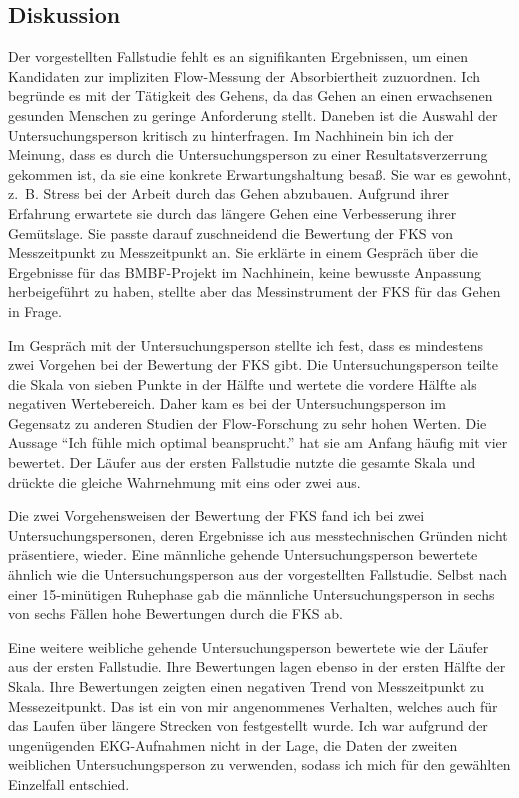 \subsection{Diskussion}
\label{sub:diskussion_2}
Der vorgestellten Fallstudie fehlt es an signifikanten Ergebnissen, um einen Kandidaten zur impliziten Flow-Messung der Absorbiertheit zuzuordnen. Ich begründe es mit der Tätigkeit des Gehens, da das Gehen an einen erwachsenen gesunden Menschen zu geringe Anforderung stellt. Daneben ist die Auswahl der Untersuchungsperson kritisch zu hinterfragen. Im Nachhinein bin ich der Meinung, dass es durch die Untersuchungsperson zu einer Resultatsverzerrung gekommen ist, da sie eine konkrete Erwartungshaltung besaß. Sie war es gewohnt, z.~B. Stress bei der Arbeit durch das Gehen abzubauen. Aufgrund ihrer Erfahrung erwartete sie durch das längere Gehen eine Verbesserung ihrer Gemütslage. Sie passte darauf zuschneidend die Bewertung der \ac{FKS} von Messzeitpunkt zu Messzeitpunkt an. Sie erklärte in einem Gespräch über die Ergebnisse für das \acs{BMBF}-Projekt im Nachhinein, keine bewusste Anpassung herbeigeführt zu haben, stellte aber das Messinstrument der \ac{FKS} für das Gehen in Frage.

Im Gespräch mit der Untersuchungsperson stellte ich fest, dass es mindestens zwei Vorgehen bei der Bewertung der \ac{FKS} gibt. Die Untersuchungsperson teilte die Skala von sieben Punkte in der Hälfte und wertete die vordere Hälfte als negativen Wertebereich. Daher kam es bei der Untersuchungsperson im Gegensatz zu anderen Studien der Flow-Forschung zu sehr hohen Werten. Die Aussage "`Ich fühle mich optimal beansprucht."' hat sie am Anfang häufig mit vier bewertet. Der Läufer aus der ersten Fallstudie nutzte die gesamte Skala und drückte die gleiche Wahrnehmung mit eins oder zwei aus. 

Die zwei Vorgehensweisen der Bewertung der \ac{FKS} fand ich bei zwei Untersuchungspersonen, deren Ergebnisse ich aus messtechnischen Gründen nicht präsentiere, wieder. Eine männliche gehende Untersuchungsperson bewertete ähnlich wie die Untersuchungsperson aus der vorgestellten Fallstudie. Selbst nach einer 15-minütigen Ruhephase gab die männliche Untersuchungsperson in sechs von sechs Fällen hohe Bewertungen durch die \ac{FKS} ab.

Eine weitere weibliche gehende Untersuchungsperson bewertete wie der Läufer aus der ersten Fallstudie. Ihre Bewertungen lagen ebenso in der ersten Hälfte der Skala. Ihre Bewertungen zeigten einen negativen Trend von Messzeitpunkt zu Messezeitpunkt. Das ist ein von mir angenommenes Verhalten, welches auch für das Laufen über längere Strecken von \citet{Schuler2009} festgestellt wurde. Ich war aufgrund der ungenügenden \ac{EKG}-Aufnahmen nicht in der Lage, die Daten der zweiten weiblichen Untersuchungsperson zu verwenden, sodass ich mich für den gewählten Einzelfall entschied.

